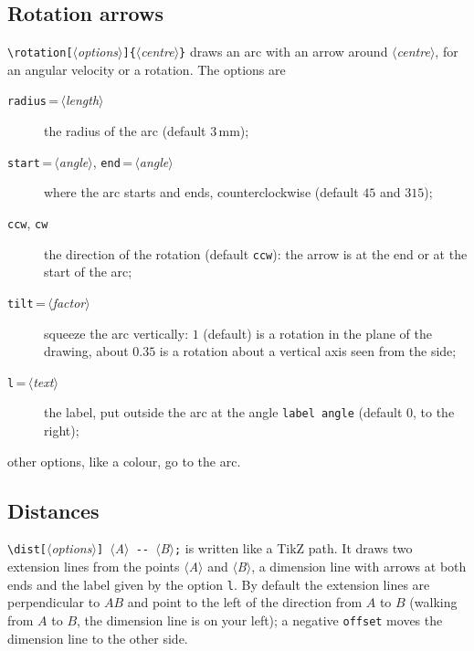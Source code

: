 \documentclass[a4paper,11pt]{article}
\newcommand\key[1]{\texttt{#1}}
\newcommand\meta[1]{\ensuremath{\langle}\textit{#1}\ensuremath{\rangle}}
\begin{document}
\subsection{Rotation arrows}
\verb|\rotation[|\meta{options}\verb|]{|\meta{centre}\verb|}| draws an arc
with an arrow around \meta{centre}, for an angular velocity or a rotation.
The options are
\begin{description}
  \item[\key{radius}\,=\,\meta{length}] the radius of the arc (default
    \(3\,\mathrm{mm}\));
  \item[\key{start}\,=\,\meta{angle}, \key{end}\,=\,\meta{angle}] where the
    arc starts and ends, counterclockwise (default \(45\) and \(315\));
  \item[\key{ccw}, \key{cw}] the direction of the rotation (default
    \key{ccw}): the arrow is at the end or at the start of the arc;
  \item[\key{tilt}\,=\,\meta{factor}] squeeze the arc vertically: \(1\)
    (default) is a rotation in the plane of the drawing, about \(0.35\) is a
    rotation about a vertical axis seen from the side;
  \item[\key{l}\,=\,\meta{text}] the label, put outside the arc at the angle
    \key{label angle} (default \(0\), to the right);
\end{description}
other options, like a colour, go to the arc.
\begin{example}
\end{example}

\subsection{Distances}
\verb|\dist[|\meta{options}\verb|] |\meta{A}\verb| -- |\meta{B}\verb|;| is
written like a TikZ path. It draws two extension lines from the points
\meta{A} and \meta{B}, a dimension line with arrows at both ends and the
label given by the option \key{l}. By default the extension lines are
perpendicular to \(AB\) and point to the left of the direction from \(A\) to
\(B\) (walking from \(A\) to \(B\), the dimension line is on your left); a
negative \key{offset} moves the dimension line to the other side.
\begin{example}
\end{example}
\end{document}
